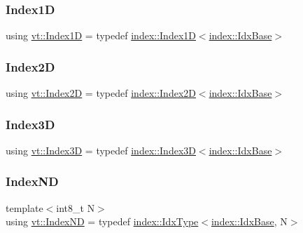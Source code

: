 \mbox{\label{namespacevt_a5540efc78234273e1796fb003fe4d234}} 
\subsubsection{\texorpdfstring{Index1D}{Index1D}}
{\footnotesize\ttfamily using \hyperlink{namespacevt_a5540efc78234273e1796fb003fe4d234}{vt\+::\+Index1D} = typedef \hyperlink{namespacevt_1_1index_a091a4f5a7a2c993d9727eaa60cf67d81}{index\+::\+Index1D}$<$\hyperlink{namespacevt_1_1index_a0dbb8d47463da27c1436e8e4ddb02743}{index\+::\+Idx\+Base}$>$}

\mbox{\label{namespacevt_a3bab786053b74a3d856fff1412ffa73a}} 
\subsubsection{\texorpdfstring{Index2D}{Index2D}}
{\footnotesize\ttfamily using \hyperlink{namespacevt_a3bab786053b74a3d856fff1412ffa73a}{vt\+::\+Index2D} = typedef \hyperlink{namespacevt_1_1index_a8373801efc8343f24d6e8ba57df40a69}{index\+::\+Index2D}$<$\hyperlink{namespacevt_1_1index_a0dbb8d47463da27c1436e8e4ddb02743}{index\+::\+Idx\+Base}$>$}

\mbox{\label{namespacevt_a2c8053bc5f2df4934272542fb3e5a0bc}} 
\subsubsection{\texorpdfstring{Index3D}{Index3D}}
{\footnotesize\ttfamily using \hyperlink{namespacevt_a2c8053bc5f2df4934272542fb3e5a0bc}{vt\+::\+Index3D} = typedef \hyperlink{namespacevt_1_1index_a2c09a09f7346d370a0bcbbfb0d4459cd}{index\+::\+Index3D}$<$\hyperlink{namespacevt_1_1index_a0dbb8d47463da27c1436e8e4ddb02743}{index\+::\+Idx\+Base}$>$}

\mbox{\label{namespacevt_a03846344a8d106928ae0dfbb2360ec30}} 
\subsubsection{\texorpdfstring{Index\+ND}{IndexND}}
{\footnotesize\ttfamily template$<$int8\+\_\+t N$>$ \\
using \hyperlink{namespacevt_a03846344a8d106928ae0dfbb2360ec30}{vt\+::\+Index\+ND} = typedef \hyperlink{namespacevt_1_1index_a939bace7aba6cd4a76b2c12a138c5991}{index\+::\+Idx\+Type}$<$\hyperlink{namespacevt_1_1index_a0dbb8d47463da27c1436e8e4ddb02743}{index\+::\+Idx\+Base}, N$>$}

